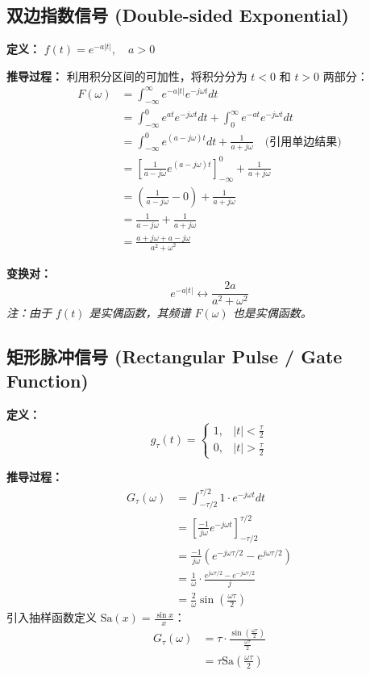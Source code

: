 \hrulefill

\subsection{双边指数信号 (Double-sided Exponential)}
\textbf{定义：} $f(t) = e^{-a|t|}, \quad a > 0$

\textbf{推导过程：}
利用积分区间的可加性，将积分分为 $t<0$ 和 $t>0$ 两部分：
\begin{align*}
    F(\omega) &= \int_{-\infty}^{\infty} e^{-a|t|} e^{-j\omega t} dt \\
    &= \int_{-\infty}^{0} e^{at} e^{-j\omega t} dt + \int_{0}^{\infty} e^{-at} e^{-j\omega t} dt \\
    &= \int_{-\infty}^{0} e^{(a-j\omega)t} dt + \frac{1}{a+j\omega} \quad \text{(引用单边结果)} \\
    &= \left[ \frac{1}{a-j\omega} e^{(a-j\omega)t} \right]_{-\infty}^{0} + \frac{1}{a+j\omega} \\
    &= \left( \frac{1}{a-j\omega} - 0 \right) + \frac{1}{a+j\omega} \\
    &= \frac{1}{a-j\omega} + \frac{1}{a+j\omega} \\
    &= \frac{a+j\omega + a-j\omega}{a^2 + \omega^2}
\end{align*}

\textbf{变换对：}
\begin{equation}
    e^{-a|t|} \longleftrightarrow \frac{2a}{a^2 + \omega^2}
\end{equation}
\textit{注：由于 $f(t)$ 是实偶函数，其频谱 $F(\omega)$ 也是实偶函数。}

\hrulefill

\subsection{矩形脉冲信号 (Rectangular Pulse / Gate Function)}
\textbf{定义：} 
\[ 
g_\tau(t) = \begin{cases} 
1, & |t| < \frac{\tau}{2} \\
0, & |t| > \frac{\tau}{2}
\end{cases} 
\]

\textbf{推导过程：}
\begin{align*}
    G_\tau(\omega) &= \int_{-\tau/2}^{\tau/2} 1 \cdot e^{-j\omega t} dt \\
    &= \left[ \frac{-1}{j\omega} e^{-j\omega t} \right]_{-\tau/2}^{\tau/2} \\
    &= \frac{-1}{j\omega} \left( e^{-j\omega \tau/2} - e^{j\omega \tau/2} \right) \\
    &= \frac{1}{\omega} \cdot \frac{e^{j\omega \tau/2} - e^{-j\omega \tau/2}}{j} \\
    &= \frac{2}{\omega} \sin\left(\frac{\omega \tau}{2}\right)
\end{align*}
引入抽样函数定义 $\text{Sa}(x) = \frac{\sin x}{x}$：
\begin{align*}
    G_\tau(\omega) &= \tau \cdot \frac{\sin(\frac{\omega \tau}{2})}{\frac{\omega \tau}{2}} \\
    &= \tau \text{Sa}\left(\frac{\omega \tau}{2}\right)
\end{align*}

